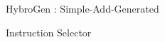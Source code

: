 \begin{Frame}{HybroGen : Simple-Add-Generated}
  \begin{block}{Instruction Selector}
    
  \end{block}

\end{Frame}
